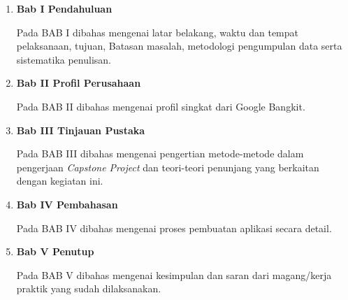 \begin{enumerate}[nolistsep]

  \item \textbf{Bab I Pendahuluan}

  Pada BAB I dibahas mengenai latar belakang, waktu dan tempat pelaksanaan, tujuan, Batasan masalah, metodologi pengumpulan data serta sistematika penulisan.

  \item \textbf{Bab II Profil Perusahaan}

  Pada BAB II dibahas mengenai profil singkat dari Google Bangkit.

  \item \textbf{Bab III Tinjauan Pustaka}

  Pada BAB III dibahas mengenai pengertian metode-metode dalam pengerjaan \textit{Capstone Project} dan teori-teori penunjang yang berkaitan dengan kegiatan ini.

  \item \textbf{Bab IV Pembahasan}

  Pada BAB IV dibahas mengenai proses pembuatan aplikasi secara detail.

  \item \textbf{Bab V Penutup}

  Pada BAB V dibahas mengenai kesimpulan dan saran dari magang/kerja praktik yang sudah dilaksanakan.

\end{enumerate}
